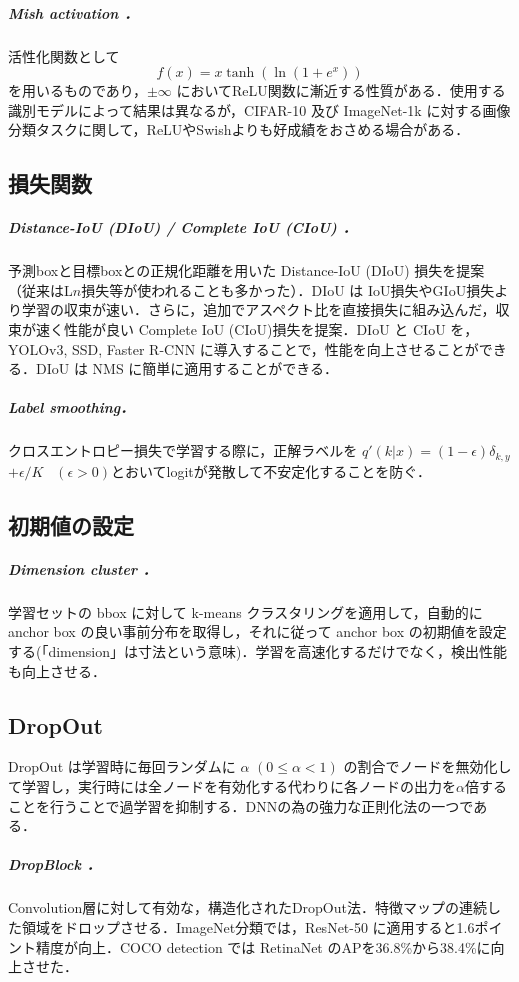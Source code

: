 \documentclass[twocolumn]{jsarticle} %
\begin{document}
\subparagraph{Mish activation \cite{Misra20}．}
活性化関数として $$f(x) = x \tanh(\ln(1 + e^x))$$ を用いるものであり，$\pm\infty$ においてReLU関数に漸近する性質がある．使用する識別モデルによって結果は異なるが，CIFAR-10 及び ImageNet-1k に対する画像分類タスクに関して，ReLUやSwish\cite{RZL18}よりも好成績をおさめる場合がある．

\subsection{損失関数}
\subparagraph{Distance-IoU (DIoU) / Complete IoU (CIoU) \cite{ZWLLYR20}．}予測boxと目標boxとの正規化距離を用いた Distance-IoU (DIoU) 損失を提案（従来はL$n$損失等が使われることも多かった）．DIoU は IoU損失やGIoU損失より学習の収束が速い．さらに，追加でアスペクト比を直接損失に組み込んだ，収束が速く性能が良い Complete IoU (CIoU)損失を提案．DIoU と CIoU を，YOLOv3, SSD\cite{LAESRFB16}, Faster R-CNN に導入することで，性能を向上させることができる．DIoU は NMS に簡単に適用することができる．

\subparagraph{Label smoothing\cite{SVISW16}．}
クロスエントロピー損失で学習する際に，正解ラベルを $q'(k|x){=}(1{-}\epsilon)\delta_{k,y}$ 
${+}\epsilon/K$ \ $(\epsilon{>}0)$とおいてlogitが発散して不安定化することを防ぐ．

\subsection{初期値の設定}
\subparagraph{Dimension cluster \cite{RedFar17}．} 学習セットの bbox に対して k-means クラスタリングを適用して，自動的に anchor box の良い事前分布を取得し，それに従って anchor box の初期値を設定する(「dimension」は寸法という意味)．学習を高速化するだけでなく，検出性能も向上させる．

\subsection{DropOut}
DropOut\cite{SHKSS14} は学習時に毎回ランダムに $\alpha$ $(0\leq\alpha<1)$ の割合でノードを無効化して学習し，実行時には全ノードを有効化する代わりに各ノードの出力を$\alpha$倍することを行うことで過学習を抑制する．DNNの為の強力な正則化法の一つである．

\subparagraph{DropBlock \cite{GLL18}．} Convolution層に対して有効な，構造化されたDropOut法．特徴マップの連続した領域をドロップさせる．ImageNet分類では，ResNet-50 に適用すると1.6ポイント精度が向上．COCO detection では RetinaNet のAPを36.8\%から38.4\%に向上させた．
\end{document}
